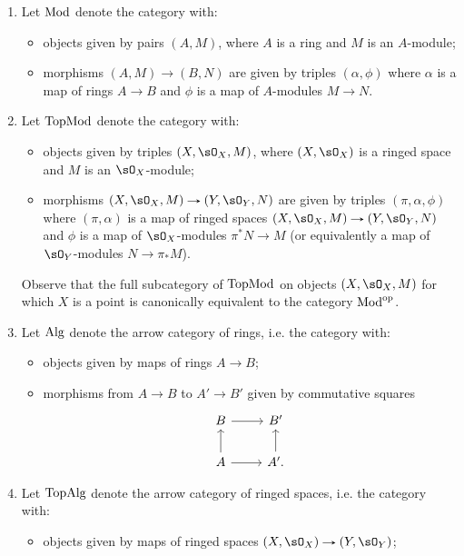 \begin{definitions}
  \label{groth-cats}
  \begin{enumerate}[leftmargin=*]
  \item \label{mod-cat}
    Let $\mathrm{Mod}$ denote the category with:
    \begin{itemize}
    \item objects given by pairs $(A,M)$, where $A$ is a ring and $M$ is an $A$-module;
    \item morphisms $(A,M) \to (B,N)$ are given by triples $(\alpha,\phi)$ where $\alpha$ is a map of rings $A \to B$ and $\phi$ is a map of $A$-modules $M \to N$.
    \end{itemize}
  \item \label{topmod-cat}
    Let $\mathrm{Top}\mathrm{Mod}$ denote the category with:
    \begin{itemize}
    \item objects given by triples $(X,\sO_X,M)$, where $(X,\sO_X)$ is a ringed space and $M$ is an $\sO_X$-module;
    \item morphisms $(X,\sO_X,M) \to (Y,\sO_Y,N)$ are given by triples $(\pi,\alpha,\phi)$ where $(\pi,\alpha)$ is a map of ringed spaces $(X,\sO_X,M) \to (Y,\sO_Y,N)$ and $\phi$ is a map of $\sO_X$-modules $\pi^*N \to M$ (or equivalently a map of $\sO_Y$-modules $N \to \pi_*M$).
    \end{itemize}
    Observe that the full subcategory of $\mathrm{Top}\mathrm{Mod}$ on objects $(X,\sO_X,M)$ for which $X$ is a point is canonically equivalent to the category $\mathrm{Mod}^{\mathrm{op}}$.
  \item \label{alg-cat}
    Let $\mathrm{Alg}$ denote the arrow category of rings, i.e. the category with:
    \begin{itemize}
    \item objects given by maps of rings $A \to B$;
    \item morphisms from $A \to B$ to $A' \to B'$ given by commutative squares
      \[
        \begin{tikzcd}
          B \ar[r] & B' \\
          A \ar[r] \ar[u] & A' \ar[u].
        \end{tikzcd}
      \]
    \end{itemize}
  \item \label{topalg-cat}
    Let $\mathrm{Top}\mathrm{Alg}$ denote the arrow category of ringed spaces, i.e. the category with:
    \begin{itemize}
    \item objects given by maps of ringed spaces $(X,\sO_X) \to (Y,\sO_Y)$;

\end{itemize}
\end{enumerate}
\end{definitions}
